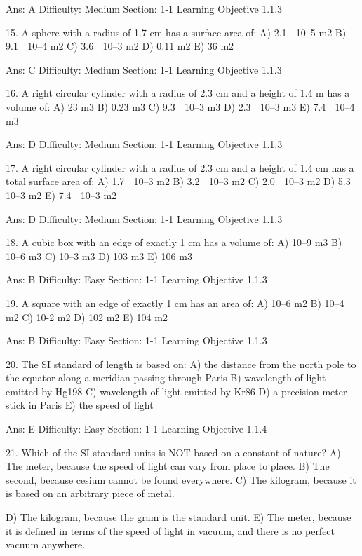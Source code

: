 Ans:  A
Difficulty:  Medium
Section:  1-1
Learning Objective 1.1.3

15.  A sphere with a radius of 1.7 cm has a surface area of: 
A)  2.1  10–5 m2
B)  9.1  10–4 m2
C)  3.6  10–3 m2
D)  0.11 m2
E)  36 m2

Ans:  C
Difficulty:  Medium
Section:  1-1
Learning Objective 1.1.3

16.  A right circular cylinder with a radius of 2.3 cm and a height of 1.4 m has a volume of: 
A)  23 m3
B)  0.23 m3
C)  9.3  10–3 m3
D)  2.3  10–3 m3
E)  7.4  10–4 m3

Ans:  D
Difficulty:  Medium
Section:  1-1
Learning Objective 1.1.3

17.  A right circular cylinder with a radius of 2.3 cm and a height of 1.4 cm has a total surface area of: 
A)  1.7  10–3 m2
B)  3.2  10–3 m2
C)  2.0  10–3 m2
D)  5.3  10–3 m2
E)  7.4  10–3 m2



Ans:  D
Difficulty:  Medium
Section:  1-1
Learning Objective 1.1.3

18.  A cubic box with an edge of exactly 1 cm has a volume of:
A)  10–9 m3
B)  10–6 m3
C)  10–3 m3
D)  103 m3
E)  106 m3

Ans:  B
Difficulty:  Easy
Section:  1-1
Learning Objective 1.1.3

19.  A square with an edge of exactly 1 cm has an area of:
A)  10–6 m2
B)  10–4 m2
C)  10-2 m2 
D)  102 m2
E)  104 m2

Ans:  B
Difficulty:  Easy
Section:  1-1
Learning Objective 1.1.3

20.  The SI standard of length is based on: 
A)  the distance from the north pole to the equator along a meridian passing through Paris 
B)  wavelength of light emitted by Hg198 
C)  wavelength of light emitted by Kr86 
D)  a precision meter stick in Paris 
E)  the speed of light 

Ans:  E
Difficulty:  Easy
Section:  1-1
Learning Objective 1.1.4

21. Which of the SI standard units is NOT based on a constant of nature?
A) The meter, because the speed of light can vary from place to place.
B) The second, because cesium cannot be found everywhere.
C) The kilogram, because it is based on an arbitrary piece of metal.



D) The kilogram, because the gram is the standard unit.
E) The meter, because it is defined in terms of the speed of light in vacuum, and there is no perfect vacuum anywhere.

